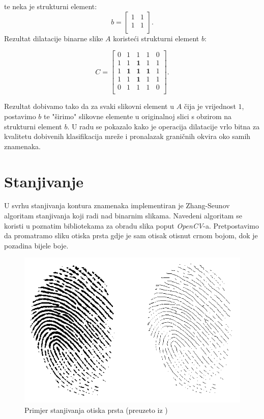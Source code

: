 \documentclass[times, utf8, diplomski]{fer}
\theoremstyle{definition}
\begin{document}
te neka je strukturni element:
\[
b=
\begin{bmatrix}
1 & 1\\
1 & 1\\
\end{bmatrix}.
\]
Rezultat dilatacije binarne slike $A$ koristeći strukturni element $b$:

\[
C=
\begin{bmatrix}
0 & 1 & 1 & 1 & 0 \\
1 & 1 & \textbf{1} & 1 & 1 \\
1 & \textbf{1} & \textbf{1} & \textbf{1} & 1 \\
1 & 1 & \textbf{1} & 1 & 1 \\
0 & 1 & 1 & 1 & 0 \\

\end{bmatrix}.
\]

Rezultat dobivamo tako da za svaki slikovni element u $A$ čija je vrijednost $1$, postavimo $b$ te "širimo" slikovne elemente u originalnoj slici s obzirom na strukturni element $b$. U radu se pokazalo kako je operacija dilatacije vrlo bitna za kvalitetu dobivenih klasifikacija mreže i pronalazak graničnih okvira oko samih znamenaka.

\section{Stanjivanje}
U svrhu stanjivanja kontura znamenaka implementiran je Zhang-Seunov algoritam stanjivanja koji radi nad binarnim slikama. Navedeni algoritam se koristi u poznatim bibliotekama za obradu slika poput \textit{OpenCV}-a. Pretpostavimo da promatramo sliku otiska prsta gdje je sam otisak otisnut crnom bojom, dok je pozadina bijele boje.

\begin{figure}[h]
\centering
\includegraphics[scale=0.46]{thinning.png}
\caption{Primjer stanjivanja otiska prsta (preuzeto iz \cite{ blog:xxx})}
\end{figure}
\end{document}
